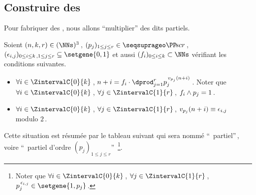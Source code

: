

\subsection{Construire des \sftab[x]}

\leavevmode

\smallskip
Pour fabriquer des \sftab[x], nous allons \enquote{multiplier} des \sftab[x] dits partiels.


\begin{defi}
	Soient $(n, k, r) \in ( \NNs )^3$\,,
	$( p_j )_{1 \leq j \leq r} \in \PPseq[r]$\,,
	$( \epsilon_{i,j} )_{0 \leq i \leq k \,, 1 \leq j \leq r} \subseteq \setgene{0, 1}$
	et aussi
	$( f_i )_{0 \leq i \leq k} \subset \NNs$
	vérifiant les conditions suivantes.
	\begin{itemize}
		\item $\forall i \in \ZintervalC{0}{k}$\,,
		$n + i = f_i \cdot \dprod_{j = 1}^{r} p_j^{\,\padicval[p_j]{n+i}}$\,.
		Noter que
		$\forall i \in \ZintervalC{0}{k}$\,,
		$\forall j \in \ZintervalC{1}{r}$\,,
		$f_i \wedge p_j = 1$\,.

		\item $\forall i \in \ZintervalC{0}{k}$\,,
		$\forall j \in \ZintervalC{1}{r}$\,,
		$\padicval[p_j]{n+i} \equiv \epsilon_{i,j}$ modulo $2$\,.
	\end{itemize}

	\smallskip

	Cette situation est résumée par le tableau suivant qui sera nommé \enquote{\sftab\ partiel}\,, voire \enquote{\sftab\ partiel d'ordre $( p_j )_{1 \leq j \leq r}$\!}\,
	\footnote{
		Noter que $\forall i \in \ZintervalC{0}{k}$\,, $\forall j \in \ZintervalC{1}{r}$\,, $p_j^{\,\epsilon_{i,j}} \in \setgene{1, p_j}$\,.
	}.

	\begin{center}
	\end{center}
\end{defi}


